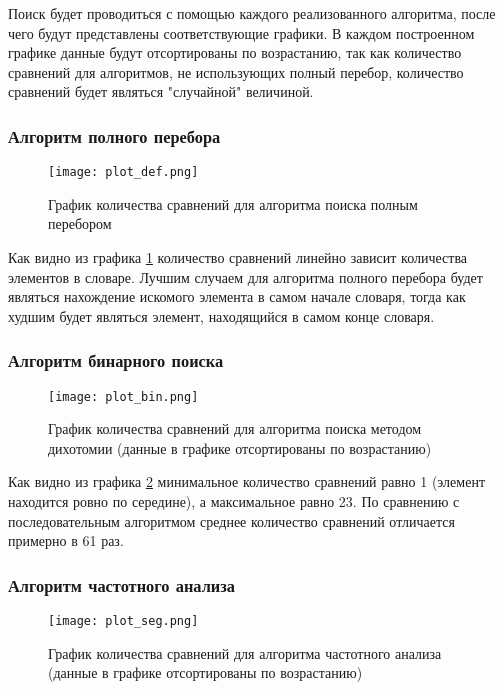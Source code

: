 Поиск будет проводиться с помощью каждого реализованного алгоритма, после чего будут представлены соответствующие графики. В каждом построенном графике данные будут отсортированы по возрастанию, так как количество сравнений для алгоритмов, не использующих полный перебор, количество сравнений будет являться "случайной" величиной.

\subsubsection{Алгоритм полного перебора}

\begin{figure}[H]
    \centering
    \texttt{[image: plot\_def.png]}
    \caption{График количества сравнений для алгоритма поиска полным перебором}
    \label{img:plot_def}
\end{figure}

Как видно из графика \ref{img:plot_def} количество сравнений линейно зависит количества элементов в словаре. Лучшим случаем для алгоритма полного перебора будет являться нахождение искомого элемента в самом начале словаря, тогда как худшим будет являться элемент, находящийся в самом конце словаря.

\subsubsection{Алгоритм бинарного поиска}

\begin{figure}[H]
    \centering
    \texttt{[image: plot\_bin.png]}
    \caption{График количества сравнений для алгоритма поиска методом дихотомии (данные в графике отсортированы по возрастанию)}
    \label{img:plot_bin}
\end{figure}

Как видно из графика \ref{img:plot_bin} минимальное количество сравнений равно 1 (элемент находится ровно по середине), а максимальное равно 23. По сравнению с последовательным алгоритмом среднее количество сравнений отличается примерно в 61 раз.

\subsubsection{Алгоритм частотного анализа}

\begin{figure}[H]
    \centering
    \texttt{[image: plot\_seg.png]}
    \caption{График количества сравнений для алгоритма частотного анализа (данные в графике отсортированы по возрастанию)}
    \label{img:plot_seg}
\end{figure}

